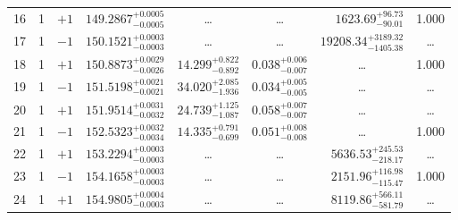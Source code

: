 \begin{table*}[!]
\begin{tabular}{llcrrlrc}
16 & 1 & $+1$ & $    149.2867_{-      0.0005}^{+      0.0005}$ & \multicolumn{1}{c}{\dots} & \multicolumn{1}{c}{\dots} & $     1623.69_{-       90.01}^{+       96.73}$ & 1.000 \\[1pt]
17 & 1 & $-1$ & $    150.1521_{-      0.0003}^{+      0.0003}$ & \multicolumn{1}{c}{\dots} & \multicolumn{1}{c}{\dots} & $    19208.34_{-     1405.38}^{+     3189.32}$ & \dots \\[1pt]
18 & 1 & $+1$ & $    150.8873_{-      0.0026}^{+      0.0029}$ & $      14.299_{-       0.892}^{+       0.822}$ & $       0.038_{-       0.007}^{+       0.006}$ & \multicolumn{1}{c}{\dots} & 1.000\\[1pt]
19 & 1 & $-1$ & $    151.5198_{-      0.0021}^{+      0.0021}$ & $      34.020_{-       1.936}^{+       2.085}$ & $       0.034_{-       0.005}^{+       0.005}$ & \multicolumn{1}{c}{\dots} & \dots\\[1pt]
20 & 1 & $+1$ & $    151.9514_{-      0.0032}^{+      0.0031}$ & $      24.739_{-       1.087}^{+       1.125}$ & $       0.058_{-       0.007}^{+       0.007}$ & \multicolumn{1}{c}{\dots} & \dots \\[1pt]
21 & 1 & $-1$ & $    152.5323_{-      0.0034}^{+      0.0032}$ & $      14.335_{-       0.699}^{+       0.791}$ & $       0.051_{-       0.008}^{+       0.008}$ & \multicolumn{1}{c}{\dots} & 1.000\\[1pt]
22 & 1 & $+1$ & $    153.2294_{-      0.0003}^{+      0.0003}$ & \multicolumn{1}{c}{\dots} & \multicolumn{1}{c}{\dots} & $     5636.53_{-      218.17}^{+      245.53}$ & \dots \\[1pt]
23 & 1 & $-1$ & $    154.1658_{-      0.0003}^{+      0.0003}$ & \multicolumn{1}{c}{\dots} & \multicolumn{1}{c}{\dots} & $     2151.96_{-      115.47}^{+      116.98}$ & 1.000 \\[1pt]
24 & 1 & $+1$ & $    154.9805_{-      0.0003}^{+      0.0004}$ & \multicolumn{1}{c}{\dots} & \multicolumn{1}{c}{\dots} & $     8119.86_{-      581.79}^{+      566.11}$ & \dots \\[1pt]
 

\end{tabular}
\end{table*}
